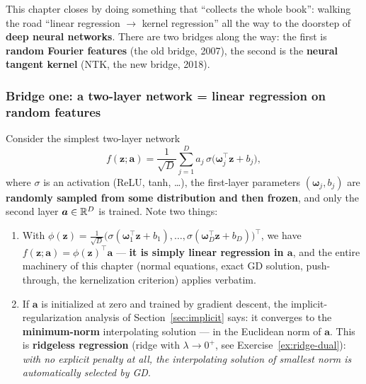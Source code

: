 This chapter closes by doing something that ``collects the whole book'': walking the road ``linear regression $\to$ kernel regression'' all the way to the doorstep of \textbf{deep neural networks}. There are two bridges along the way: the first is \textbf{random Fourier features} (the old bridge, 2007), the second is the \textbf{neural tangent kernel} (NTK, the new bridge, 2018)\cite{jacot2018}.

\subsubsection*{Bridge one: a two-layer network = linear regression on random features}

Consider the simplest two-layer network
\begin{equation}\label{eq:two-layer}
  f(\bm{z}; \bm{a}) = \frac{1}{\sqrt{D}} \sum_{j=1}^{D} a_j\, \sigma\big( \bm{\omega}_j^\top \bm{z} + b_j \big),
\end{equation}
where $\sigma$ is an activation (ReLU, tanh, \dots), the first-layer parameters $(\bm{\omega}_j, b_j)$ are \textbf{randomly sampled from some distribution and then frozen}, and only the second layer $\bm{a} \in \mathbb{R}^D$ is trained. Note two things:

\begin{enumerate}[label=(\arabic*)]
  \item With $\phi(\bm{z}) = \tfrac{1}{\sqrt{D}}\big(\sigma(\bm{\omega}_1^\top\bm{z}+b_1), \dots, \sigma(\bm{\omega}_D^\top\bm{z}+b_D)\big)^\top$, we have $f(\bm{z};\bm{a}) = \phi(\bm{z})^\top\bm{a}$ --- \textbf{it is simply linear regression in $\bm{a}$}, and the entire machinery of this chapter (normal equations, exact GD solution, push-through, the kernelization criterion) applies verbatim.
  \item If $\bm{a}$ is initialized at zero and trained by gradient descent, the implicit-regularization analysis of Section~\ref{sec:implicit} says: it converges to the \textbf{minimum-norm} interpolating solution --- in the Euclidean norm of $\bm{a}$. This is \textbf{ridgeless regression} (ridge with $\lambda \to 0^+$, see Exercise~\ref{ex:ridge-dual}): \textit{with no explicit penalty at all, the interpolating solution of smallest norm is automatically selected by GD}.
\end{enumerate}

